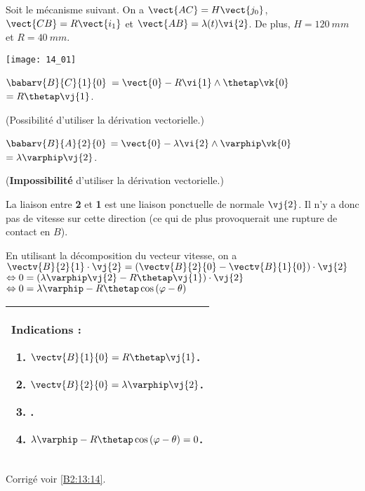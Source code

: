 \normalfalse \difficiletrue \tdifficilefalse
\correctiontrue


\setcounter{question}{0}
\ifcorrection
\else
{}
\fi

\ifprof
\else
Soit le mécanisme suivant. On a $\vect{AC}=H\vect{j_0}$, $\vect{CB}=R\vect{i_1}$ et $\vect{AB}=\lambda(t) \vi{2}$. De plus, 
$H=\SI{120}{mm}$ et $R=\SI{40}{mm}$. 

\begin{center}
\texttt{[image: 14\_01]}
\end{center}
\fi


\ifprof
$\babarv{B}{C}{1}{0}$ 
$=\vect{0}-R\vi{1}\wedge\thetap\vk{0}$
$=R\thetap\vj{1}$.

(Possibilité d'utiliser la dérivation vectorielle.)

\else
\fi

\ifprof
$\babarv{B}{A}{2}{0}$ 
$=\vect{0}-\lambda \vi{2}\wedge\varphip\vk{0}$
$=\lambda\varphip\vj{2}$.

(\textbf{Impossibilité} d'utiliser la dérivation vectorielle.)

\else
\fi

\ifprof
La liaison entre \textbf{2} et \textbf{1} est une liaison ponctuelle de normale $\vj{2}$. Il n'y a donc pas de vitesse sur cette direction (ce qui de plus provoquerait une rupture de contact en $B$). 
\else
\fi

\ifprof
En utilisant la décomposition du vecteur vitesse, on a
$\vectv{B}{2}{1}\cdot \vj{2} =\left( \vectv{B}{2}{0} - \vectv{B}{1}{0}\right) \cdot \vj{2}$
$ \Leftrightarrow {0} =\left( \lambda\varphip\vj{2} - R\thetap\vj{1}\right) \cdot \vj{2}$
$ \Leftrightarrow {0} = \lambda\varphip - R\thetap \cos \left( \varphi - \theta\right)$

\else
\fi





\ifprof
\else
\footnotesize
\ifcolle
\else
\begin{center}
\begin{tabular}{|p{.9\linewidth}|}
\hline
Indications :
\begin{enumerate}
\item $\vectv{B}{1}{0}=R\thetap\vj{1}$.
\item $\vectv{B}{2}{0}=\lambda\varphip\vj{2}$.
\item .
\item $ \lambda\varphip - R\thetap \cos \left( \varphi - \theta\right)=0$.
\end{enumerate} \\ \hline
\end{tabular}
\end{center}
\fi
\normalsize

\begin{flushright}
\footnotesize{Corrigé  voir \ref{B2:13:14}.}
\end{flushright}%
\fi
